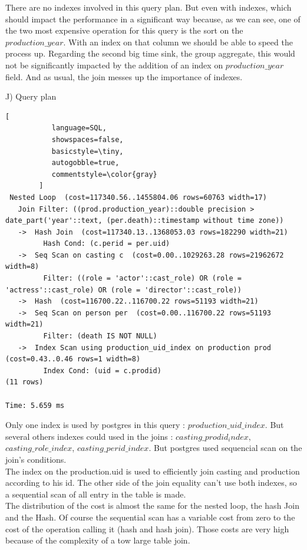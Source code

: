 \documentclass{article}
\begin{document}
There are no indexes involved in this query plan. But even with indexes, which should impact the performance in a significant way because, as we can see, one of the two most expensive operation for this query is the sort on the $production\_year$. With an index on that column we should be able to speed the process up. Regarding the second big time sink, the group aggregate, this would not be significantly impacted by the addition of an index on $production\_year$ field.
And as usual, the join messes up the importance of indexes.

J) Query plan \\
\begin{lstlisting}[
           language=SQL,
           showspaces=false,
           basicstyle=\tiny,
           autogobble=true,
           commentstyle=\color{gray}
        ]
 Nested Loop  (cost=117340.56..1455804.06 rows=60763 width=17)
   Join Filter: ((prod.production_year)::double precision > date_part('year'::text, (per.death)::timestamp without time zone))
   ->  Hash Join  (cost=117340.13..1368053.03 rows=182290 width=21)
         Hash Cond: (c.perid = per.uid)
   ->  Seq Scan on casting c  (cost=0.00..1029263.28 rows=21962672 width=8)
         Filter: ((role = 'actor'::cast_role) OR (role = 'actress'::cast_role) OR (role = 'director'::cast_role))
   ->  Hash  (cost=116700.22..116700.22 rows=51193 width=21)
   ->  Seq Scan on person per  (cost=0.00..116700.22 rows=51193 width=21)
         Filter: (death IS NOT NULL)
   ->  Index Scan using production_uid_index on production prod  (cost=0.43..0.46 rows=1 width=8)
         Index Cond: (uid = c.prodid)
(11 rows)

Time: 5.659 ms
\end{lstlisting}

Only one index is used by postgres in this query : $production\_uid\_index$. But several others indexes could used in the joins : $casting\_prodid_index$,  $casting\_role\_index$, $casting\_perid\_index$. But postgres used sequencial scan on the join's conditions.\\

The index on the production.uid is used to efficiently join casting and production according to his id. The other side of the join equality can't use both indexes, so a sequential scan of all entry in the table is made.\\

The distribution of the cost is almost the same for the nested loop, the hash Join and the Hash. Of course the sequential scan has a variable cost from zero to the cost of the operation calling it (hash and hash join). Those costs are very high because of the complexity of a tow large table join.\\
\end{document}
